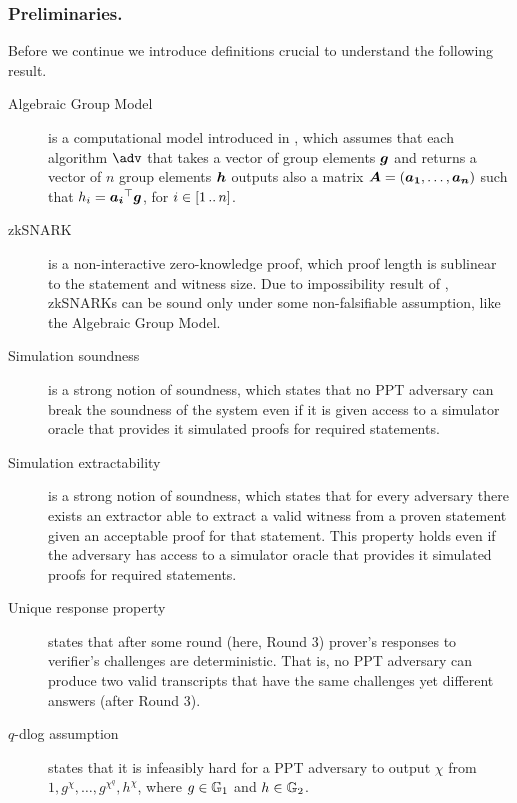 \documentclass[runningheads,11pt]{llncs}
\let\spvec\vec
\let\vec\accentvec
\let\vec\spvec
\def\vec#1{\mathchoice{\mbox{\boldmath$\displaystyle#1$}}
	{\mbox{\boldmath$\textstyle#1$}}
	{\mbox{\boldmath$\scriptstyle#1$}}
	{\mbox{\boldmath$\scriptscriptstyle#1$}}}
\begin{document}
	\subsubsection*{Preliminaries.}
	Before we continue we introduce definitions crucial to understand the following result. 
	\begin{description}
		\item[Algebraic Group Model] is a computational model introduced in \cite{C:FucKilLos18}, which assumes that each algorithm $\adv$ that takes a vector of group elements $\vec{g}$ and returns a vector of $n$ group elements $\vec{h}$ outputs also a matrix $\vec{A} = (\vec{a_1}, \ldots, \vec{a_n})$ such that $h_i = \vec{a_i}^\top \vec{g}$, for $i \in [1 \, .. \, n]$.
		\item[zkSNARK] is a non-interactive zero-knowledge proof, which proof length is sublinear to the statement and witness size. Due to impossibility result of \cite{STOC:GenWic11}, zkSNARKs can be sound only under some non-falsifiable assumption, like the Algebraic Group Model.
		\item[Simulation soundness] is a strong notion of soundness, which states that no PPT adversary can break the soundness of the system even if it is given access to a simulator oracle that provides it simulated proofs for required statements.
		\item[Simulation extractability] is a strong notion of soundness, which states that for every adversary there exists an extractor able to extract a valid witness from a proven statement given an acceptable proof for that statement. This property holds even if the adversary has access to a simulator oracle that provides it simulated proofs for required statements. 
		\item[Unique response property] states that after some round (here, Round 3) prover's responses to verifier's challenges are deterministic. That is, no PPT adversary can produce two valid transcripts that have the same challenges yet different answers (after Round 3).
		\item[$q$-dlog assumption] states that it is infeasibly hard for a PPT adversary to output $\chi$ from $1, g^{\chi}, \ldots, g^{\chi^q}, h^{\chi}$, where $g \in \mathbb{G}_1$ and $h \in \mathbb{G}_2$.
	\end{description}
	
\end{document}
